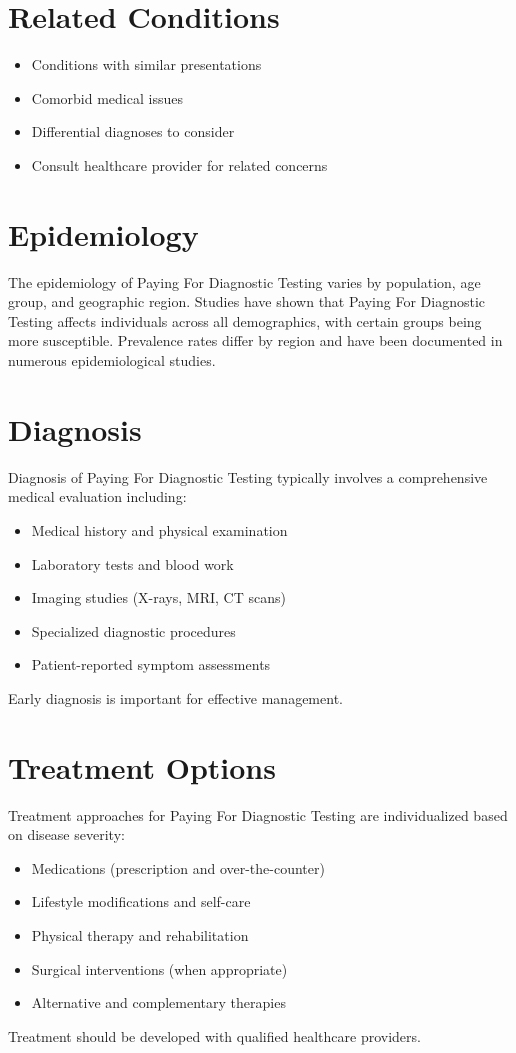 \section*{Related Conditions}
\begin{itemize}
  \item Conditions with similar presentations
  \item Comorbid medical issues
  \item Differential diagnoses to consider
  \item Consult healthcare provider for related concerns
\end{itemize}

\section*{Epidemiology}
The epidemiology of Paying For Diagnostic Testing varies by population, age group, and geographic region. Studies have shown that Paying For Diagnostic Testing affects individuals across all demographics, with certain groups being more susceptible. Prevalence rates differ by region and have been documented in numerous epidemiological studies.

\section*{Diagnosis}
Diagnosis of Paying For Diagnostic Testing typically involves a comprehensive medical evaluation including:
\begin{itemize}
  \item Medical history and physical examination
  \item Laboratory tests and blood work
  \item Imaging studies (X-rays, MRI, CT scans)
  \item Specialized diagnostic procedures
  \item Patient-reported symptom assessments
\end{itemize}
Early diagnosis is important for effective management.

\section*{Treatment Options}
Treatment approaches for Paying For Diagnostic Testing are individualized based on disease severity:
\begin{itemize}
  \item Medications (prescription and over-the-counter)
  \item Lifestyle modifications and self-care
  \item Physical therapy and rehabilitation
  \item Surgical interventions (when appropriate)
  \item Alternative and complementary therapies
\end{itemize}
Treatment should be developed with qualified healthcare providers.

